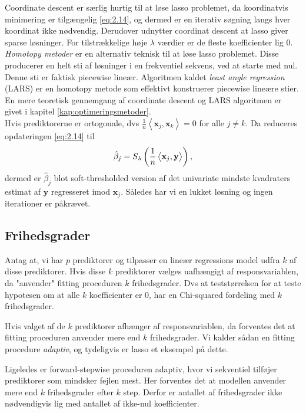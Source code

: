Coordinate descent er særlig hurtig til at løse lasso problemet, da koordinatvis minimering er tilgængelig \eqref{eq:2.14}, og dermed er en iterativ søgning langs hver koordinat ikke nødvendig.
Derudover udnytter coordinat descent at lasso giver sparse løsninger.
For tilstrækkelige høje \(\lambda\) værdier er de fleste koefficienter lig $0$. \\[2mm] 
%
\textit{Homotopy metoder} er en alternativ teknisk til at løse lasso problemet. Disse producerer en helt sti af løsninger i en frekventiel sekvens, ved at starte med nul.
Denne sti er faktisk piecewise lineær.
Algoritmen kaldet \textit{least angle regression} (LARS) er en homotopy metode som effektivt konstruerer piecewise lineære stier.
En mere teoretisk gennemgang af coordinate descent og LARS algoritmen er givet i kapitel \ref{kap:optimeringsmetoder}. \\[2mm]


Hvis prediktorerne er ortogonale, dvs $\frac{1}{n} \left\langle \mathbf{x}_j, \mathbf{x}_k \right\rangle = 0$ for alle $j \neq k$.
Da reduceres opdateringen \eqref{eq:2.14} til
\begin{align*}
\hat{\beta}_j = S_\lambda \del{\frac{1}{n} \left\langle \mathbf{x}_j, \mathbf{y} \right\rangle},
\end{align*}
dermed er $\hat{\beta}_j$ blot soft-thresholded version af det univariate mindste kvadraters estimat af $\mathbf{y}$ regresseret imod $\mathbf{x}_j$. Således har vi en lukket løsning og ingen iterationer er påkrævet.

\subsection{Frihedsgrader}
Antag at, vi har \(p\) prediktorer og tilpasser en lineær regressions model udfra \(k\) af disse prediktorer.
Hvis disse \(k\) prediktorer vælges uafhængigt af responsvariablen, da "anvender" fitting proceduren \(k\) frihedsgrader.
Dvs at teststørrelsen for at teste hypotesen om at alle \(k\) koefficienter er 0, har en Chi-squared fordeling med \(k\) frihedsgrader.

Hvis valget af de \(k\) prediktorer afhænger af responsvariablen, da forventes det at fitting proceduren anvender mere end \(k\) frihedsgrader. 
Vi kalder sådan en fitting procedure \textit{adaptiv}, og tydeligvis er lasso et eksempel på dette.

Ligeledes er forward-stepwise proceduren adaptiv, hvor vi sekventiel tilføjer prediktorer som mindsker fejlen mest.
Her forventes det at modellen anvender mere end \(k\) frihedsgrader efter \(k\) step.
Derfor er antallet af frihedsgrader ikke nødvendigvis lig med antallet af ikke-nul koefficienter.

